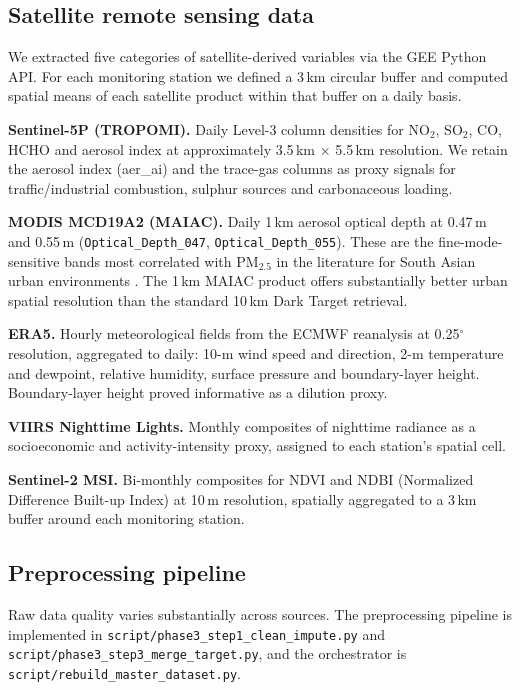 \documentclass{iopjournal}
\begin{document}
\subsection{Satellite remote sensing data}

We extracted five categories of satellite-derived variables via the
GEE Python API. For each monitoring station we defined a 3\,km
circular buffer and computed spatial means of each satellite product
within that buffer on a daily basis.

\textbf{Sentinel-5P (TROPOMI).} Daily Level-3 column densities for
NO$_2$, SO$_2$, CO, HCHO and aerosol index at approximately
3.5\,km $\times$ 5.5\,km resolution. We retain the aerosol index
(aer\_ai) and the trace-gas columns as proxy signals for
traffic/industrial combustion, sulphur sources and carbonaceous
loading.

\textbf{MODIS MCD19A2 (MAIAC).} Daily 1\,km aerosol optical depth at
0.47\,\textmu m and 0.55\,\textmu m
(\texttt{Optical\_Depth\_047}, \texttt{Optical\_Depth\_055}). These
are the fine-mode-sensitive bands most correlated with PM$_{2.5}$ in
the literature for South Asian urban environments \cite{Gupta2006}. The
1\,km MAIAC product offers substantially better urban spatial
resolution than the standard 10\,km Dark Target retrieval.

\textbf{ERA5.} Hourly meteorological fields from the ECMWF reanalysis
at 0.25$^{\circ}$ resolution, aggregated to daily: 10-m wind speed and
direction, 2-m temperature and dewpoint, relative humidity, surface
pressure and boundary-layer height. Boundary-layer height proved
informative as a dilution proxy.

\textbf{VIIRS Nighttime Lights.} Monthly composites of nighttime
radiance as a socioeconomic and activity-intensity proxy, assigned
to each station's spatial cell.

\textbf{Sentinel-2 MSI.} Bi-monthly composites for NDVI and NDBI
(Normalized Difference Built-up Index) at 10\,m resolution, spatially
aggregated to a 3\,km buffer around each monitoring station.

\subsection{Preprocessing pipeline}

Raw data quality varies substantially across sources. The
preprocessing pipeline is implemented in
\texttt{script/phase3\_step1\_clean\_impute.py} and
\texttt{script/phase3\_step3\_merge\_target.py}, and the orchestrator
is \texttt{script/rebuild\_master\_dataset.py}.
\end{document}
